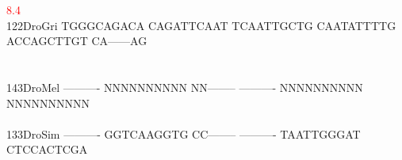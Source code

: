 \documentclass[11pt,twoside,reqno,a4paper]{article}
\begin{document}
{\hspace*{4\charwidth}\hspace*{7\charwidth}\hspace*{1\charwidth}\hspace*{1\charwidth}\hspace*{1\charwidth}\hspace*{1\charwidth}\hspace*{41\charwidth}\textcolor{Red}{8.4}\hspace*{1\charwidth}\hspace*{1\charwidth}\\
122\hspace*{1\charwidth}DroGri	TGGGCAGACA	CAGATTCAAT	TCAATTGCTG	CAATATTTTG	ACCAGCTTGT	CA------AG	\\
\hspace*{4\charwidth}\hspace*{7\charwidth}\hspace*{1\charwidth}\hspace*{1\charwidth}\hspace*{1\charwidth}\hspace*{1\charwidth}\hspace*{1\charwidth}\hspace*{1\charwidth}\\
\\
143\hspace*{1\charwidth}DroMel	----------	NNNNNNNNNN	NN--------	----------	NNNNNNNNNN	NNNNNNNNNN	\\
\hspace*{4\charwidth}\hspace*{7\charwidth}\hspace*{1\charwidth}\hspace*{1\charwidth}\hspace*{1\charwidth}\hspace*{1\charwidth}\hspace*{1\charwidth}\hspace*{1\charwidth}\\
133\hspace*{1\charwidth}DroSim	----------	GGTCAAGGTG	CC--------	----------	TAATTGGGAT	CTCCACTCGA	\\
\hspace*{4\charwidth}\hspace*{7\charwidth}\hspace*{1\charwidth}\hspace*{1\charwidth}\hspace*{1\charwidth}\hspace*{1\charwidth}\hspace*{1\charwidth}\hspace*{1\charwidth}\\
}
\end{document}
